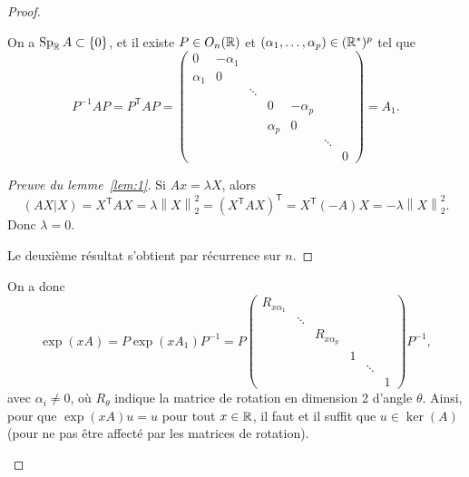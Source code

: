 \documentclass[12pt]{article}
\begin{document}
\begin{proof}
\begin{enumerate}
		\begin{lemma}
			\label{lem:1}
			On a $\operatorname{Sp}_{\mathbb{R}}A\subset\left\lbrace0\right\rbrace$, et il existe $P\in O_n(\mathbb{R})$ et $(\alpha_1,\dots,\alpha_p)\in(\mathbb{R}^{*})^{p}$ tel que 
			\begin{equation}
				P^{-1}AP=P^{\mathsf{T}}AP=\begin{pmatrix}
					0&-\alpha_1\\
					\alpha_1&0\\
					&&\ddots\\
					&&&0&-\alpha_p\\
					&&&\alpha_p&0\\
					&&&&&\ddots\\
					&&&&&&0
				\end{pmatrix}=A_1.
			\end{equation}
		\end{lemma}
		\begin{proof}[Preuve du lemme~\ref{lem:1}]
			Si $Ax=\lambda X$, alors 
			\begin{equation}
				(AX|X)=X^{\mathsf{T}}AX=\lambda\left\lVert X\right\rVert_{2}^{2}=(X^{\mathsf{T}}AX)^{\mathsf{T}}=X^{\mathsf{T}}(-A)X=-\lambda\left\lVert X\right\rVert_{2}^{2}.
			\end{equation}
			Donc $\lambda=0$.

			Le deuxième résultat s'obtient par récurrence sur $n$.
		\end{proof}

		On a donc 
		\begin{equation}
			\exp(xA)=P\exp(xA_1)P^{-1}=P\begin{pmatrix}
				R_{x\alpha_1}\\
				&\ddots\\
				&&R_{x\alpha_p}\\
				&&&1\\
				&&&&\ddots\\
				&&&&&1
			\end{pmatrix}P^{-1},
		\end{equation}
		avec $\alpha_{i}\neq0$, où $R_{\theta}$ indique la matrice de rotation en dimension 2 d'angle $\theta$. Ainsi, pour que $\exp(xA)u=u$ pour tout $x\in\mathbb{R}$, il faut et il suffit que $u\in\ker(A)$ (pour ne pas être affecté par les matrices de rotation).
	\end{enumerate}
\end{proof}
\end{document}
